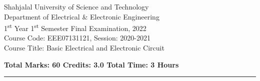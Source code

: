 

\begin{center}
	\Large{Shahjalal University of Science and Technology}\\
	\large{Department of Electrical \& Electronic Engineering}\\
	1\textsuperscript{st} Year 1\textsuperscript{st} Semester Final Examination, 2022\\
	Course Code: EEE07131121, Session: 2020-2021\\
	Course Title: Basic Electrical and Electronic Circuit\\
	
	
	
\end{center}

\vspace{-2mm}
\begin{flushleft}
\large{\bfseries Total Marks: 60  \hspace{42mm} Credits: 3.0 \hfill Total Time: 3 Hours}
\end{flushleft}
\vspace{-6mm}
\noindent\rule{\textwidth}{2pt}

